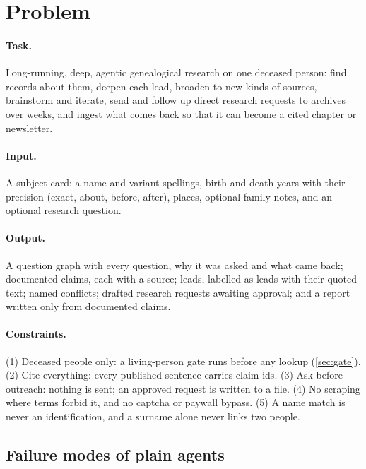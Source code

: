 \section{Problem}
\label{sec:problem}

\paragraph{Task.} Long-running, deep, agentic genealogical research on one deceased person: find records about them, deepen each lead, broaden to new kinds of sources, brainstorm and iterate, send and follow up direct research requests to archives over weeks, and ingest what comes back so that it can become a cited chapter or newsletter.

\paragraph{Input.} A subject card: a name and variant spellings, birth and death years with their precision (exact, about, before, after), places, optional family notes, and an optional research question. \paragraph{Output.} A question graph with every question, why it was asked and what came back; documented claims, each with a source; leads, labelled as leads with their quoted text; named conflicts; drafted research requests awaiting approval; and a report written only from documented claims.

\paragraph{Constraints.} (1) Deceased people only: a living-person gate runs before any lookup (\cref{sec:gate}). (2) Cite everything: every published sentence carries claim ids. (3) Ask before outreach: nothing is sent; an approved request is written to a file. (4) No scraping where terms forbid it, and no captcha or paywall bypass. (5) A name match is never an identification, and a surname alone never links two people.

\subsection{Failure modes of plain agents}
\label{sec:failures}

